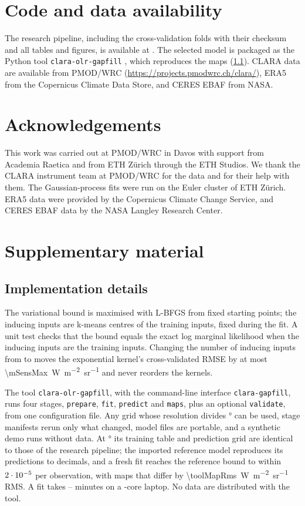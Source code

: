 \documentclass[10pt,twocolumn,a4paper]{article}
\newcommand{\clara}[1]{\SI{#1}{W.m^{-2}.sr^{-1}}}
\begin{document}
\section*{Code and data availability}
The research pipeline, including the cross-validation folds with their checksum and all tables and figures, is available at \cite{andreozzi2026repo}. The selected model is packaged as the Python tool \texttt{clara-olr-gapfill} \cite{andreozzi2026tool}, which reproduces the maps (\cref{app:impl}). CLARA data are available from PMOD/WRC (\url{https://projects.pmodwrc.ch/clara/}), ERA5 from the Copernicus Climate Data Store, and CERES EBAF from NASA.

\section*{Acknowledgements}
This work was carried out at PMOD/WRC in Davos with support from Academia Raetica and from ETH Z\"urich through the ETH Studios. We thank the CLARA instrument team at PMOD/WRC for the data and for their help with them. The Gaussian-process fits were run on the Euler cluster of ETH Z\"urich. ERA5 data were provided by the Copernicus Climate Change Service, and CERES EBAF data by the NASA Langley Research Center.

\balance
\renewcommand{\bibfont}{\small}
\setlength{\bibsep}{2pt plus 1pt}



\appendix
\section{Supplementary material}

\subsection{Implementation details}\label{app:impl}
The variational bound is maximised with L-BFGS from \nStarts{} fixed starting points; the \nInducing{} inducing inputs are k-means centres of the training inputs, fixed during the fit. A unit test checks that the bound equals the exact log marginal likelihood when the inducing inputs are the training inputs. Changing the number of inducing inputs from \mSensLo{} to \mSensHi{} moves the exponential kernel's cross-validated RMSE by at most \clara{\mSensMax} and never reorders the kernels.

The tool \texttt{clara-olr-gapfill}, with the command-line interface \texttt{clara-gapfill}, runs four stages, \texttt{prepare}, \texttt{fit}, \texttt{predict} and \texttt{maps}, plus an optional \texttt{validate}, from one configuration file. Any grid whose resolution divides \gridDivisor° can be used, stage manifests rerun only what changed, model files are portable, and a synthetic demo runs without data. At \gridRes° its training table and prediction grid are identical to those of the research pipeline; the imported reference model reproduces its predictions to \toolDecimals{} decimals, and a fresh fit reaches the reference bound to within $2\cdot10^{-5}$ per observation, with maps that differ by \clara{\toolMapRms} RMS. A fit takes \toolFitWallLo--\toolFitWallHi{} minutes on a \toolFitCores-core laptop. No data are distributed with the tool.
\end{document}
